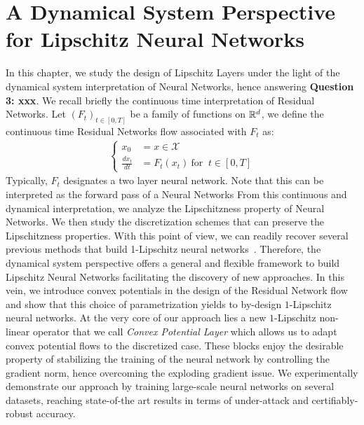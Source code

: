 \chapter{A Dynamical System Perspective for Lipschitz Neural Networks}
\label{chap:dynam}
\minitoc
In this chapter, we study the design of Lipschitz Layers under the light of the dynamical system interpretation of Neural Networks, hence answering \textbf{Question 3: xxx}. We recall briefly the continuous time interpretation of Residual Networks.
Let $(F_{t})_{t\in[0,T]}$ be a family of functions on $\mathbb{R}^d$, we define the continuous time Residual Networks flow associated with $F_t$ as:
\begin{align*}
  \left\{
    \begin{array}{ll}
    x_0 &= x\in\mathcal{X}\\
    \frac{dx_{t}}{dt} &= F_{{t}}(x_{t}) \  \text{for } \ t\in[0, T]
  \end{array}
  \right.
\end{align*}
Typically, $ F_{{t}}$ designates a two layer neural network. Note that this can be interpreted as the forward pass of a Neural Networks
From this continuous and dynamical interpretation, we  analyze the Lipschitzness property of Neural Networks. We then study the discretization schemes that can preserve the Lipschitzness properties. With this point of view, we can readily recover several previous methods that build 1-Lipschitz neural networks~\citep{trockman2021orthogonalizing,skew2021sahil}.
Therefore, the dynamical system perspective offers a general and flexible framework to build Lipschitz Neural Networks facilitating the discovery of new approaches.
In this vein, we introduce convex potentials in the design of the Residual Network flow and show that this choice of parametrization yields to by-design $1$-Lipschitz neural networks.
At the very core of our approach lies a new $1$-Lipschitz non-linear operator that we call {\em Convex Potential Layer} which allows us to adapt convex potential flows to the discretized case. 
These blocks enjoy the desirable property of stabilizing the training of the neural network by controlling the gradient norm, hence overcoming the exploding gradient issue.
We experimentally demonstrate our approach by training large-scale neural networks on several datasets, reaching state-of-the art results in terms of under-attack and certifiably-robust accuracy.

